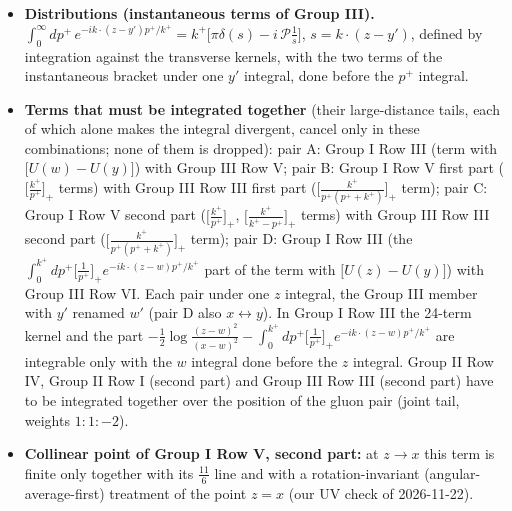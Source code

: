 \documentclass[9pt]{article}
\numberwithin{equation}{section}
\begin{document}
{\begin{itemize}
\begin{align}
\int_{0}^{k^{+}}dp^{+}\Big[\frac{k^{+}}{k^{+}-p^{+}}\Big]_{+}f(p^{+})&=\int_{0}^{k^{+}}dp^{+}\,\frac{k^{+}}{k^{+}-p^{+}}\big[f(p^{+})-f(k^{+})\big]\,,\notag\\
\int_{0}^{\infty}dp^{+}\Big[\frac{k^{+}}{p^{+}\,(p^{+}+k^{+})}\Big]_{+}f(p^{+})&=\int_{0}^{\infty}dp^{+}\,\frac{k^{+}}{p^{+}\,(p^{+}+k^{+})}\big[f(p^{+})-f(0)\big]\,.
\end{align}
\item \textbf{Distributions (instantaneous terms of Group III).} $\int_{0}^{\infty}dp^{+}\,e^{-ik\cdot(z-y')p^{+}/k^{+}}=k^{+}\big[\pi\delta(s)-i\,\mathcal{P}\frac{1}{s}\big]$, $s=k\cdot(z-y')$, defined by integration against the transverse kernels, with the two terms of the instantaneous bracket under one $y'$ integral, done before the $p^{+}$ integral.
\item \textbf{Terms that must be integrated together} (their large-distance tails, each of which alone makes the integral divergent, cancel only in these combinations; none of them is dropped): pair A: Group I Row III (term with $\big[U(w)-U(y)\big]$) with Group III Row V; pair B: Group I Row V first part ($\big[\frac{k^{+}}{p^{+}}\big]_{+}$ terms) with Group III Row III first part ($\big[\frac{k^{+}}{p^{+}(p^{+}+k^{+})}\big]_{+}$ term); pair C: Group I Row V second part ($\big[\frac{k^{+}}{p^{+}}\big]_{+}$, $\big[\frac{k^{+}}{k^{+}-p^{+}}\big]_{+}$ terms) with Group III Row III second part ($\big[\frac{k^{+}}{p^{+}(p^{+}+k^{+})}\big]_{+}$ term); pair D: Group I Row III (the $\int_{0}^{k^{+}}dp^{+}\big[\frac{1}{p^{+}}\big]_{+}e^{-ik\cdot(z-w)p^{+}/k^{+}}$ part of the term with $\big[U(z)-U(y)\big]$) with Group III Row VI. Each pair under one $z$ integral, the Group III member with $y'$ renamed $w'$ (pair D also $x\leftrightarrow y$). In Group I Row III the 24-term kernel and the part $-\frac{1}{2}\log\frac{(z-w)^{2}}{(x-w)^{2}}-\int_{0}^{k^{+}}dp^{+}\big[\frac{1}{p^{+}}\big]_{+}e^{-ik\cdot(z-w)p^{+}/k^{+}}$ are integrable only with the $w$ integral done before the $z$ integral. Group II Row IV, Group II Row I (second part) and Group III Row III (second part) have to be integrated together over the position of the gluon pair (joint tail, weights $1:1:-2$).
\item \textbf{Collinear point of Group I Row V, second part:} at $z\to x$ this term is finite only together with its $\frac{11}{6}$ line and with a rotation-invariant (angular-average-first) treatment of the point $z=x$ (our UV check of 2026-11-22).
\end{itemize}
}
\end{document}
